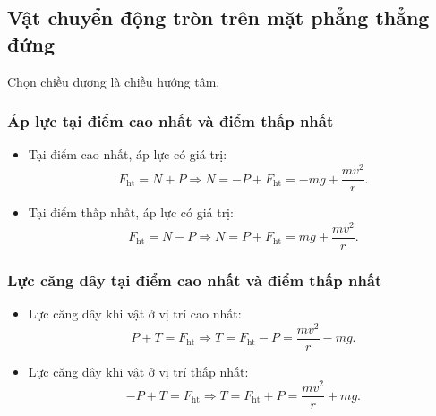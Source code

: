 \subsection{Vật chuyển động tròn trên mặt phẳng thẳng đứng}
Chọn chiều dương là chiều hướng tâm.
\subsubsection{Áp lực tại điểm cao nhất và điểm thấp nhất}
\begin{itemize}
	\item Tại điểm cao nhất, áp lực có giá trị:
	\begin{equation*}
		F_\text{ht}=N+P\Rightarrow	N=-P + F_{\text{ht}}= -mg + \dfrac{mv^2}{r}.
	\end{equation*}
	\item Tại điểm thấp nhất, áp lực có giá trị:
	\begin{equation*}
		F_\text{ht}=N-P\Rightarrow	N = P + F_{\text{ht}} = mg + \dfrac{mv^2}{r}.
	\end{equation*}
\end{itemize}
\subsubsection{Lực căng dây tại điểm cao nhất và điểm thấp nhất}
\begin{itemize}
	\item Lực căng dây khi vật ở vị trí cao nhất:
	\begin{equation*}
		P+T=F_{\text{ht}} \Rightarrow T = F_\text{ht} - P = \dfrac{mv^2}{r} - mg.
	\end{equation*}
	\item Lực căng dây khi vật ở vị trí thấp nhất:
	\begin{equation*}
		-P+T = F_{\text{ht}} \Rightarrow T = F_\text{ht} + P = \dfrac{mv^2}{r} + mg.
	\end{equation*}
\end{itemize}
